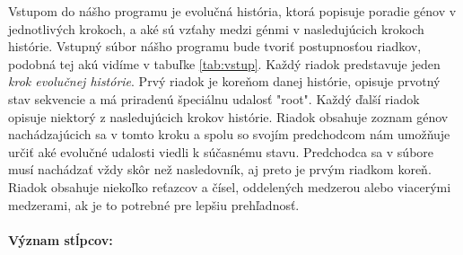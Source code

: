 Vstupom do nášho programu je evolučná história, ktorá popisuje poradie génov v jednotlivých krokoch, a aké
sú vzťahy medzi génmi v nasledujúcich krokoch histórie.
Vstupný súbor nášho programu bude tvoriť postupnosťou riadkov, podobná tej akú vidíme v tabuľke  \ref{tab:vstup}.
Každý riadok predstavuje jeden \emph{krok evolučnej histórie}.
Prvý riadok je koreňom danej histórie, opisuje prvotný stav sekvencie a má priradenú 
špeciálnu udalosť "root".
Každý ďalší riadok opisuje niektorý z nasledujúcich krokov histórie. 
Riadok obsahuje zoznam génov nachádzajúcich sa v tomto kroku
a spolu so svojím predchodcom nám umožňuje určiť aké evolučné udalosti viedli k súčasnému stavu.
Predchodca sa v súbore musí nachádzať vždy skôr než nasledovník, aj preto je prvým riadkom koreň.
Riadok obsahuje niekoľko reťazcov a čísel, oddelených medzerou alebo viacerými medzerami, ak je to potrebné pre lepšiu prehľadnosť.
\paragraph{Význam stĺpcov:}


